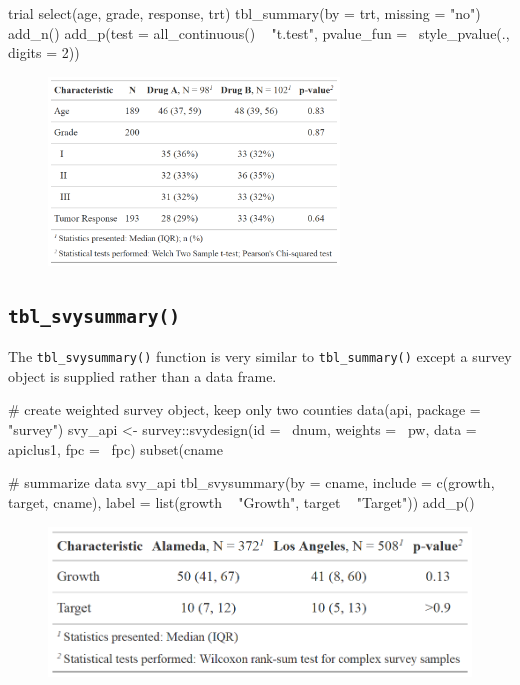 \begin{example}
trial %
  select(age, grade, response, trt) %
  tbl_summary(by = trt, missing = "no") %
  add_n() %
  add_p(test = all_continuous() ~ "t.test",
        pvalue_fun = ~style_pvalue(., digits = 2))

\end{example}
\begin{figure}[h!]
  \includegraphics[height=5cm]{summary_plus_plus.png}
  \centering
\end{figure}

\subsection{\texorpdfstring{\texttt{tbl\_svysummary()}}{tbl\_svysummary()}}

The \texttt{tbl\_svysummary()} function is very similar to \texttt{tbl\_summary()} except a survey object is supplied rather than a data frame.

\begin{example}
# create weighted survey object, keep only two counties
data(api, package = "survey")
svy_api <- 
  survey::svydesign(id = ~dnum, weights = ~pw, data = apiclus1, fpc = ~fpc) %
  subset(cname %

# summarize data
svy_api %
  tbl_svysummary(by = cname, 
                 include = c(growth, target, cname),
                 label = list(growth ~ "Growth",
                              target ~ "Target")) %
  add_p()
\end{example}
\begin{figure}[h!]
  \includegraphics[height=4cm]{svysummary.png}
  \centering
\end{figure}

